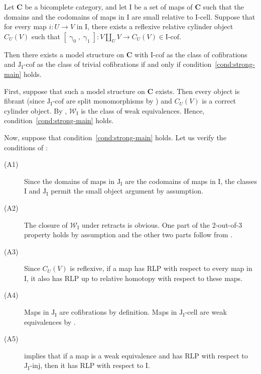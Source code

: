 \documentclass{tac}
\theoremstyle{definition}
\newcommand{\we}{\mathcal{W}}
\newcommand{\cat}[1]{\mathbf{#1}}
\newcommand{\C}{\cat{C}}
\newcommand{\I}{\mathrm{I}}
\newcommand{\J}{\mathrm{J}}
\newcommand{\class}[2]{#1\text{-}\mathrm{#2}}
\newcommand{\Iinj}[1][\I]{\class{#1}{inj}}
\newcommand{\Icell}[1][\I]{\class{#1}{cell}}
\newcommand{\Icof}[1][\I]{\class{#1}{cof}}
\newcommand{\Jinj}[1][]{\Iinj[\J#1]}
\newcommand{\Jcell}[1][]{\Icell[\J#1]}
\newcommand{\Jcof}[1][]{\Icof[\J#1]}
\newcommand{\cyli}{\upgamma}
\begin{document}
\begin{thm}[main]
Let $\C$ be a bicomplete category, and let $\I$ be a set of maps of $\C$ such that the domains and the codomains of maps in $\I$ are small relative to $\Icell$.
Suppose that for every map $i : U \to V$ in $\I$, there exists a reflexive relative cylinder object $C_U(V)$ such that $[\cyli_0,\cyli_1] : V \amalg_U V \to C_U(V) \in \Icof$.

Then there exists a model structure on $\C$ with $\Icof$ as the class of cofibrations and $\Jcof[_\I]$ as the class of trivial cofibrations
if and only if condition~\eqref{cond:strong-main} holds.
\end{thm}
\proof
First, suppose that such a model structure on $\C$ exists.
Then every object is fibrant (since $\Jcof[_\I]$ are split monomorphisms by ) and $C_U(V)$ is a correct cylinder object.
By , $\we_\I$ is the class of weak equivalences.
Hence, condition~\eqref{cond:strong-main} holds.

Now, suppose that condition~\eqref{cond:strong-main} holds.
Let us verify the conditions of :
\begin{description}
\item[(A1)] Since the domains of maps in $\J_\I$ are the codomains of maps in $\I$, the classes $\I$ and $\J_\I$ permit the small object argument by assumption.
\item[(A2)] The closure of $\we_\I$ under retracts is obvious.
One part of the 2-out-of-3 property holds by assumption and the other two parts follow from .
\item[(A3)] Since $C_U(V)$ is reflexive, if a map has RLP with respect to every map in $\I$, it also has RLP up to relative homotopy with respect to these maps.
\item[(A4)] Maps in $\J_\I$ are cofibrations by definition. Maps in $\Jcell[_\I]$ are weak equivalences by .
\item[(A5)]  implies that if a map is a weak equivalence and has RLP with respect to $\Jinj[_\I]$, then it has RLP with respect to $\I$.
\end{description}
\endproof
\end{document}
